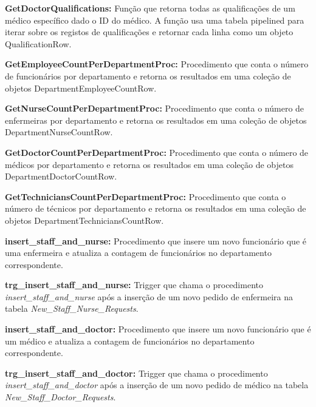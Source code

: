 \vspace{0.15cm}
\textbf{GetDoctorQualifications:} Função que retorna todas as qualificações de um médico específico dado o ID do médico. A função usa uma tabela pipelined para iterar sobre os registos de qualificações e retornar cada linha como um objeto QualificationRow.

\vspace{0.15cm}
\textbf{GetEmployeeCountPerDepartmentProc:} Procedimento que conta o número de funcionários por departamento e retorna os resultados em uma coleção de objetos DepartmentEmployeeCountRow.

\vspace{0.15cm}
\textbf{GetNurseCountPerDepartmentProc:} Procedimento que conta o número de enfermeiras por departamento e retorna os resultados em uma coleção de objetos DepartmentNurseCountRow.

\vspace{0.15cm}
\textbf{GetDoctorCountPerDepartmentProc:} Procedimento que conta o número de médicos por departamento e retorna os resultados em uma coleção de objetos DepartmentDoctorCountRow.

\vspace{0.15cm}
\textbf{GetTechniciansCountPerDepartmentProc:} Procedimento que conta o número de técnicos por departamento e retorna os resultados em uma coleção de objetos DepartmentTechniciansCountRow.

\vspace{0.15cm}
\textbf{insert\_staff\_and\_nurse:} Procedimento que insere um novo funcionário que é uma enfermeira e atualiza a contagem de funcionários no departamento correspondente.

\vspace{0.15cm}
\textbf{trg\_insert\_staff\_and\_nurse:} Trigger que chama o procedimento \textit{insert\_staff\_and\_nurse} após a inserção de um novo pedido de enfermeira na tabela \textit{New\_Staff\_Nurse\_Requests}.

\vspace{0.15cm}
\textbf{insert\_staff\_and\_doctor:} Procedimento que insere um novo funcionário que é um médico e atualiza a contagem de funcionários no departamento correspondente.

\vspace{0.15cm}
\textbf{trg\_insert\_staff\_and\_doctor:} Trigger que chama o procedimento \textit{insert\_staff\_and\_doctor} após a inserção de um novo pedido de médico na tabela \textit{New\_Staff\_Doctor\_Requests}.

